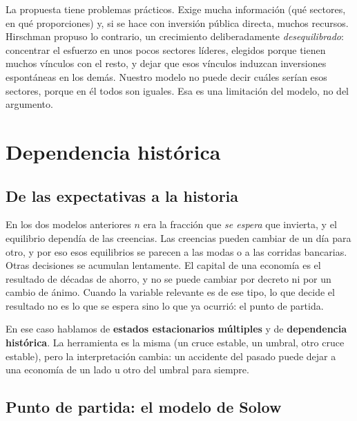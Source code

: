 \documentclass[12pt,letterpaper]{article}
\begin{document}
La propuesta tiene problemas prácticos. Exige mucha información (qué sectores, en qué proporciones) y, si se hace con inversión pública directa, muchos recursos. Hirschman propuso lo contrario, un crecimiento deliberadamente \emph{desequilibrado}: concentrar el esfuerzo en unos pocos sectores líderes, elegidos porque tienen muchos vínculos con el resto, y dejar que esos vínculos induzcan inversiones espontáneas en los demás. Nuestro modelo no puede decir cuáles serían esos sectores, porque en él todos son iguales. Esa es una limitación del modelo, no del argumento.

\section{Dependencia histórica}\label{sec:hist}

\subsection{De las expectativas a la historia}

En los dos modelos anteriores $n$ era la fracción que \emph{se espera} que invierta, y el equilibrio dependía de las creencias. Las creencias pueden cambiar de un día para otro, y por eso esos equilibrios se parecen a las modas o a las corridas bancarias. Otras decisiones se acumulan lentamente. El capital de una economía es el resultado de décadas de ahorro, y no se puede cambiar por decreto ni por un cambio de ánimo. Cuando la variable relevante es de ese tipo, lo que decide el resultado no es lo que se espera sino lo que ya ocurrió: el punto de partida.

En ese caso hablamos de \textbf{estados estacionarios múltiples} y de \textbf{dependencia histórica}. La herramienta es la misma (un cruce estable, un umbral, otro cruce estable), pero la interpretación cambia: un accidente del pasado puede dejar a una economía de un lado u otro del umbral para siempre.

\subsection{Punto de partida: el modelo de Solow}
\end{document}
